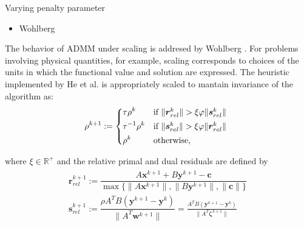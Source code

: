 \documentclass[8pt,red]{beamer}
\theoremstyle{plain}
\theoremstyle{definition}
\theoremstyle{remark}
\renewcommand{\Re}{\ensuremath{\mathbb{R}}}
\newcommand{\bi}[1]{\ensuremath{\boldsymbol{#1}}}
\begin{document}
\begin{frame}{Varying penalty parameter}
\begin{itemize}
\item Wohlberg
\end{itemize}
The behavior of ADMM under scaling is addresed by Wohlberg \citep{wohlberg2017admm}. For problems involving physical quantities, for example, scaling corresponds to choices of the units in which the functional value and solution are expressed. The heuristic implemented by He et al. is appropriately scaled to mantain invariance of the algorithm as:
\begin{align}
  \rho^{k+1} := 
  \begin{dcases*}
	\tau \rho^{k}
    & if $ \| \bi{r}_{rel}^{k} \| > \xi \varphi \| \bi{s}_{rel}^{k} \|$ \\
    \tau^{-1} \rho^{k}
    & if $ \| \bi{s}_{rel}^{k} \| > \xi \varphi \| \bi{r}_{rel}^{k} \|$ \\
    \rho^{k}
    & otherwise, \\
  \end{dcases*}  
\end{align}

where $\xi \in \Re^{+}$ and the relative primal and dual residuals are defined by
\begin{align}
\begin{array}{l}
  \bi{r}_{rel}^{k+1}
  := \dfrac{A \bi{x}^{k+1} + B \bi{y}^{k+1} - \bi{c}}{\max \lbrace \|A \bi{x}^{k+1}\|,\|B \bi{y}^{k+1}\|, \|\bi{c}\|  \rbrace }  \\
  \bi{s}_{rel}^{k+1}
  := \dfrac{\rho A^{T} B \left( \bi{y}^{k+1} - \bi{y}^{k} \right)}{\|A^{T} \bi{w}^{k+1}\|}
  = \frac{A^{T} B \left( \bi{y}^{k+1} - \bi{y}^{k} \right)}{\|A^{T} \bi{\zeta}^{k+1}\|} 
\end{array}
\end{align}
\end{frame}
\end{document}
